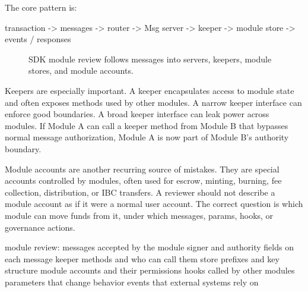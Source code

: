 The core pattern is:

\begin{codeblock}
transaction
    -> messages
    -> router
    -> Msg server
    -> keeper
    -> module store
    -> events / responses
\end{codeblock}

\begin{figure}[htbp]
\centering
{}
\caption{SDK module review follows messages into servers, keepers, module stores, and module accounts.}
\end{figure}

Keepers are especially important. A keeper encapsulates access to module state and often exposes methods used by other modules. A narrow keeper interface can enforce good boundaries. A broad keeper interface can leak power across modules. If Module A can call a keeper method from Module B that bypasses normal message authorization, Module A is now part of Module B's authority boundary.

Module accounts are another recurring source of mistakes. They are special accounts controlled by modules, often used for escrow, minting, burning, fee collection, distribution, or IBC transfers. A reviewer should not describe a module account as if it were a normal user account. The correct question is which module can move funds from it, under which messages, params, hooks, or governance actions.

\begin{codeblock}
module review:
    messages accepted by the module
    signer and authority fields on each message
    keeper methods and who can call them
    store prefixes and key structure
    module accounts and their permissions
    hooks called by other modules
    parameters that change behavior
    events that external systems rely on
\end{codeblock}

